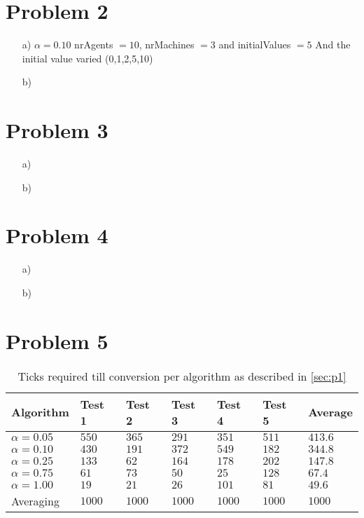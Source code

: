 \documentclass[12pt]{article}
\begin{document}
\section*{Problem 2}
\begin{enumerate}
	\item[a)]
	$\alpha = 0.10$
	nrAgents $= 10$, nrMachines $=3$ and initialValues $=5$
	And the initial value varied (0,1,2,5,10)



	\item[b)]
\end{enumerate}

\section*{Problem 3}

\begin{enumerate}
	\item[a)]
	\item[b)]
\end{enumerate}

\section*{Problem 4}

\begin{enumerate}
	\item[a)]
	\item[b)]
\end{enumerate}

\section*{Problem 5}




\begin{table}[]
\centering
\begin{tabular}{|l|l|l|l|l|l|l|}
\hline
Algorithm       & Test 1                   & Test 2 & Test 3 & Test 4 & Test 5 & Average  \\ \hline
$\alpha = 0.05$ & $550$         & $365$    & $291$    & $351$    & $511$    & $413.6$ 		\\ \hline
$\alpha = 0.10$ & $430$ 				& $191$    & $372$    & $549$    & $182$    & $344.8$ 		\\ \hline
$\alpha = 0.25$ & $133$         & $62$     & $164$    & $178$    & $202$    & $147.8$ 		\\ \hline
$\alpha = 0.75$ & $61$          & $73$     & $50$     & $25$     & $128$    & $67.4$      \\ \hline
$\alpha = 1.00$ & $19$          & $21$     & $26$     & $101$    & $81$     & $49.6$      \\ \hline
Averaging       & $1000$        & $1000$   & $1000$   & $1000$   & $1000$   & $1000$      \\ \hline
\end{tabular}
\caption{Ticks required till conversion per algorithm as described in \ref{sec:p1} }
\label{table:P1-comparisson}
\end{table}
\end{document}
